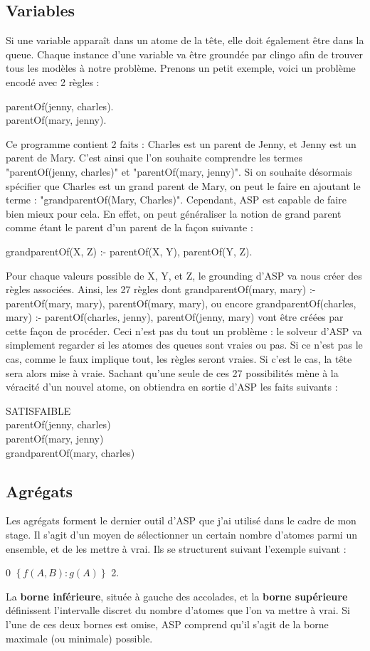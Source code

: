 \documentclass[12pt,a4paper]{article}
\begin{document}
\subsection{Variables}
Si une variable apparaît dans un atome de la tête, elle doit également être dans la queue. Chaque instance d'une variable va être groundée par clingo afin de trouver tous les modèles à notre problème.
Prenons un petit exemple, voici un problème encodé avec 2 règles :
\begin{center}
  parentOf(jenny, charles).\\
  parentOf(mary, jenny).
\end{center}
Ce programme contient 2 faits : Charles est un parent de Jenny, et Jenny est un parent de Mary. C'est ainsi que l'on souhaite comprendre les termes "parentOf(jenny, charles)" et "parentOf(mary, jenny)".
Si on souhaite désormais spécifier que Charles est un grand parent de Mary, on peut le faire en ajoutant le terme : "grandparentOf(Mary, Charles)". Cependant, ASP est capable de faire bien mieux pour cela.
En effet, on peut généraliser la notion de grand parent comme étant le parent d'un parent de la façon suivante :
\begin{center}
  grandparentOf(X, Z) :- parentOf(X, Y), parentOf(Y, Z).
\end{center}
Pour chaque valeurs possible de X, Y, et Z, le grounding d'ASP va nous créer des règles associées.
Ainsi, les 27 règles dont grandparentOf(mary, mary) :- parentOf(mary, mary), parentOf(mary, mary), ou encore grandparentOf(charles, mary) :- parentOf(charles, jenny), parentOf(jenny, mary) vont être créées 
par cette façon de procéder. Ceci n'est pas du tout un problème : le solveur d'ASP va simplement regarder si les atomes des queues sont vraies ou pas. Si ce n'est pas le cas, comme le faux implique tout, 
les règles seront vraies. Si c'est le cas, la tête sera alors mise à vraie. Sachant qu'une seule de ces 27 possibilités mène à la véracité d'un nouvel atome, on obtiendra en sortie d'ASP les faits suivants :
\begin{center}
  SATISFAIBLE\\
  parentOf(jenny, charles)\\
  parentOf(mary, jenny)\\
  grandparentOf(mary, charles)
\end{center}
\subsection{Agrégats}
Les agrégats forment le dernier outil d'ASP que j'ai utilisé dans le cadre de mon stage. Il s'agit d'un moyen de sélectionner un certain nombre d'atomes parmi un ensemble, et de les mettre à vrai. Ils se 
structurent suivant l'exemple suivant :
\begin{center}
  0 $\left\{ f(A,B):g(A)\right\}$ 2.
\end{center}
La \textbf{borne inférieure}, située à gauche des accolades, et la \textbf{borne supérieure} définissent l'intervalle discret du nombre d'atomes que l'on va mettre à vrai. Si l'une de ces deux bornes est omise, 
ASP comprend qu'il s'agit de la borne maximale (ou minimale) possible.
\end{document}
